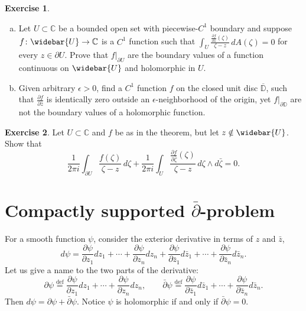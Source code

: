 \documentclass[12pt,openany]{book}
\newcommand{\C}{{\mathbb{C}}}
\newcommand{\D}{{\mathbb{D}}}
\theoremstyle{plain}
\theoremstyle{remark}
\theoremstyle{definition}
\newenvironment{exbox}{%
    \def\FrameCommand{\vrule width 1pt \relax\hspace{10pt}}%
    \MakeFramed{\advance\hsize-\width\FrameRestore}%
}{%
    \endMakeFramed
}
\newenvironment{exparts}{%
    \leavevmode\begin{enumerate}[a),noitemsep,topsep=0pt,parsep=0pt,partopsep=0pt]
}{%
    \end{enumerate}
}
\theoremstyle{exercise}
\newtheorem{exercise}{Exercise}[section]
\theoremstyle{example}
\begin{document}
\begin{exbox}
\begin{exercise}
\begin{exparts}
\item
Let $U \subset \C$ be a bounded open set with piecewise-$C^1$ boundary and
suppose $f \colon \widebar{U} \to \C$ is a $C^1$ function such
that
$\int_{U} \frac{\frac{\partial f}{\partial \bar{z}}(\zeta)}{\zeta-z} \,
dA(\zeta) =
0$ for every $z \in \partial U$.  Prove that $f|_{\partial U}$ are the boundary
values of a function continuous on $\widebar{U}$ and holomorphic in $U$.
\item
Given arbitrary $\epsilon > 0$, find a $C^1$ function $f$ on the closed unit disc
$\overline{\D}$,
such that $\frac{\partial f}{\partial \bar{z}}$ is identically zero
outside an $\epsilon$-neighborhood of the origin, yet $f|_{\partial \D}$
are not the boundary values of a holomorphic function.
\end{exparts}
\end{exercise}

\begin{exercise}
Let $U \subset \C$ and $f$ be as in the theorem, but let $z \notin
\widebar{U}$.  Show that
\begin{equation*}
\frac{1}{2\pi i}
\int_{\partial U}
\frac{f(\zeta)}{\zeta-z}
\,
d \zeta
+
\frac{1}{2\pi i}
\int_{U}
\frac{\frac{\partial f}{\partial \bar{\zeta}}(\zeta)}{\zeta-z}
\,
d\zeta \wedge d\bar{\zeta}
= 0 .
\end{equation*}
\end{exercise}
\end{exbox}


\section{Compactly supported \texorpdfstring{$\bar{\partial}$}{dbar}-problem}
\label{sec:compactdbar}

For a smooth function $\psi$, consider the exterior
derivative in terms of $z$ and $\bar{z}$,
%
\begin{equation*}
d \psi =
\frac{\partial \psi}{\partial z_1} dz_1 + \cdots +
\frac{\partial \psi}{\partial z_n} dz_n
+
\frac{\partial \psi}{\partial \bar{z}_1} d\bar{z}_1 + \cdots +
\frac{\partial \psi}{\partial \bar{z}_n} d\bar{z}_n .
\end{equation*}
Let us give a name to the two parts of the derivative:
%
%
\begin{equation*}
\partial \psi \overset{\text{def}}{=}
\frac{\partial \psi}{\partial z_1} dz_1 + \cdots +
\frac{\partial \psi}{\partial z_n} dz_n, \qquad
\bar{\partial} \psi \overset{\text{def}}{=}
\frac{\partial \psi}{\partial \bar{z}_1} d\bar{z}_1 + \cdots +
\frac{\partial \psi}{\partial \bar{z}_n} d\bar{z}_n .
\end{equation*}
Then $d \psi = \partial \psi + \bar{\partial} \psi$.
Notice $\psi$ is holomorphic if and only if $\bar{\partial} \psi = 0$.
\end{document}
